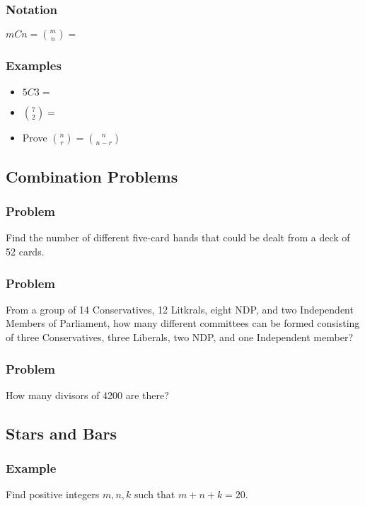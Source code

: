 \documentclass{article}
\begin{document}
\subsubsection{Notation}
$mCn={m \choose n}=$
\subsubsection{Examples}
\begin{itemize}
    \item $5C3=$
    \item ${7 \choose 2}=$
    \item Prove $ {n \choose r} = {n \choose n-r} $ 
\end{itemize}
\pagebreak

\subsection{Combination Problems}

\subsubsection{Problem}
Find the number of different five-card hands that could be dealt from a deck of 52 cards.
\vspace{20px}

\subsubsection{Problem}
From a group of 14 Conservatives, 12 Litkrals, eight NDP, and two Independent Members of Parliament, how many different committees can be formed consisting of three Conservatives, three Liberals, two NDP, and one Independent member?
\vspace{20px}

\subsubsection{Problem}
How many divisors of 4200 are there?
\vspace{20px}

\subsection{Stars and Bars}
\subsubsection{Example}
Find positive integers $m,n,k$ such that $m+n+k = 20$.
\vspace{50px}
\end{document}
